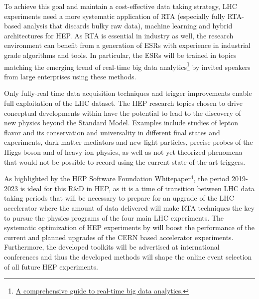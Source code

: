 To achieve this goal and maintain a cost-effective data taking strategy, LHC experiments need a more systematic application of RTA (especially fully RTA-based analysis that discards bulky raw data), machine learning and hybrid architectures for HEP. 
As RTA is essential in industry as well, the research environment can benefit from a generation of ESRs with experience in industrial grade algorithms and tools. 
In particular, the ESRs will be trained in topics matching the emerging trend of real-time big data analytics\footnote{\href{https://www.scnsoft.com/blog/real-time-big-data-analytics-comprehensive-guide}{A comprehensive guide to real-time big data analytics.}} by invited speakers from large enterprises using these methods.   

\noindent {\color{blue}{2. The \acronym research program could lead to breakthroughs in our understanding of nature}}
Only fully-real time data acquisition techniques and trigger improvements enable full exploitation of the LHC dataset. 
The HEP research topics chosen to drive conceptual developments within \acronym have the potential to lead to the discovery of new physics beyond the Standard Model. 
Examples include studies of lepton flavor and its conservation and universality in different final states and experiments, dark matter mediators and new light particles, precise probes of the Higgs boson and of heavy ion physics, as well as not-yet-theorized phenomena that would not be possible to record using the current state-of-the-art triggers. 

As highlighted by the HEP Software Foundation Whitepaper$^{4}$, the period 2019-2023 is ideal for this R\&D in HEP, as it is a time of transition between LHC data taking periods that will be necessary to prepare for an upgrade of the LHC accelerator where the amount of data delivered will make RTA techniques the key to pursue the physics programs of the four main LHC experiments.
The systematic optimization of HEP experiments by \acronym will boost the performance of the current and planned upgrades of the CERN based accelerator experiments.
Furthermore, the developed toolkits will be advertised at international conferences and thus the developed methods will shape the online event selection of all future HEP experiments. 

